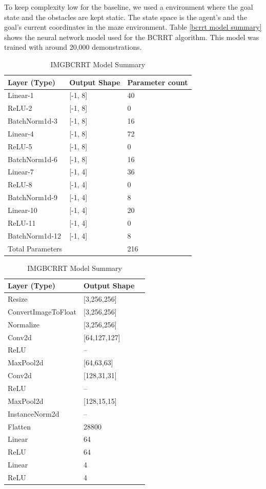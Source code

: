 \documentclass{article}
\begin{document}
To keep complexity low for the baseline, we used a environment where the goal state and the obstacles are kept static. The state space is the agent's and the goal's current coordinates in the maze environment.
Table \ref{bcrrt model summary} shows the neural network model used for the BCRRT algorithm. This model was trained with around 20,000 demonstrations. 

\begin{table}[h]
\parbox{.45\linewidth}{
  \caption{BCRRT Model Summary}
  \label{bcrrt model summary}
  \centering
  \begin{tabular}{lll}
    \cmidrule(r){1-3}
   Layer (Type)          & Output Shape       &Parameter count\\
    \midrule
    Linear-1 & [-1, 8] & 40\\
    ReLU-2 & [-1, 8] & 0\\
    BatchNorm1d-3 & [-1, 8] & 16\\
    Linear-4 & [-1, 8] & 72\\
    ReLU-5 & [-1, 8] & 0\\
    BatchNorm1d-6 & [-1, 8] & 16\\
    Linear-7 & [-1, 4] & 36\\
    ReLU-8 & [-1, 4] & 0\\
    BatchNorm1d-9 & [-1, 4] & 8\\
    Linear-10 & [-1, 4] & 20\\
    ReLU-11 & [-1, 4] & 0\\
    BatchNorm1d-12 & [-1, 4] & 8\\
    \bottomrule
    \cmidrule(r){1-2}
        Total Parameters & & 216\\
    \bottomrule
  \end{tabular}}
  \hfill
\parbox{.45\linewidth}{
\caption{IMGBCRRT Model Summary}
	\label{imgbcrrt model summary}
	\centering
	\begin{tabular}{lll}
		\cmidrule(r){1-2}
		Layer (Type) & Output Shape\\
		\midrule
		Resize & [3,256,256]\\
		ConvertImageToFloat & [3,256,256]\\
		Normalize & [3,256,256]\\
		\midrule
		Conv2d & [64,127,127]\\
		ReLU & --\\
		MaxPool2d & [64,63,63]\\
		Conv2d & [128,31,31]\\
		ReLU & --\\
		MaxPool2d & [128,15,15]\\
		InstanceNorm2d & --\\
		\midrule
		Flatten & 28800\\
		Linear & 64\\
		ReLU & 64\\
		Linear & 4\\
		ReLU & 4\\
		\bottomrule
	\end{tabular}
	}
\end{table}
\end{document}
